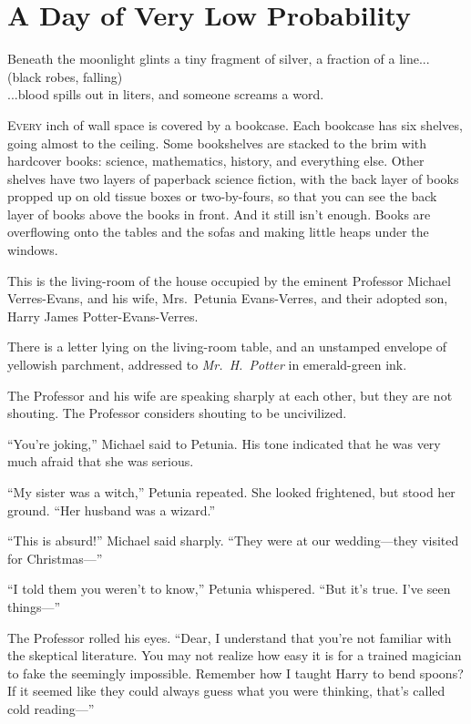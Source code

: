 \chapter{A Day of Very Low Probability}

\epigraph{\centering Beneath the moonlight glints a tiny fragment of silver, a fraction of a line...\\(black robes, falling)\\...blood spills out in liters, and someone screams a word.}{}
\lettrine{E}{very} inch of wall space is covered by a bookcase. Each bookcase has six shelves, going almost to the ceiling. Some bookshelves are stacked to the brim with hardcover books: science, mathematics, history, and everything else. Other shelves have two layers of paperback science fiction, with the back layer of books propped up on old tissue boxes or two-by-fours, so that you can see the back layer of books above the books in front. And it still isn’t enough. Books are overflowing onto the tables and the sofas and making little heaps under the windows.

This is the living-room of the house occupied by the eminent Professor Michael Verres-Evans, and his wife, Mrs.~Petunia Evans-Verres, and their adopted son, Harry James Potter-Evans-Verres.

There is a letter lying on the living-room table, and an unstamped envelope of yellowish parchment, addressed to \emph{Mr.~H.~Potter} in emerald-green ink.

The Professor and his wife are speaking sharply at each other, but they are not shouting. The Professor considers shouting to be uncivilized.

“You’re joking,” Michael said to Petunia. His tone indicated that he was very much afraid that she was serious.

“My sister was a witch,” Petunia repeated. She looked frightened, but stood her ground. “Her husband was a wizard.”

“This is absurd!” Michael said sharply. “They were at our wedding—they visited for Christmas—”

“I told them you weren’t to know,” Petunia whispered. “But it’s true. I’ve seen things—”

The Professor rolled his eyes. “Dear, I understand that you’re not familiar with the skeptical literature. You may not realize how easy it is for a trained magician to fake the seemingly impossible. Remember how I taught Harry to bend spoons? If it seemed like they could always guess what you were thinking, that’s called cold reading—”

